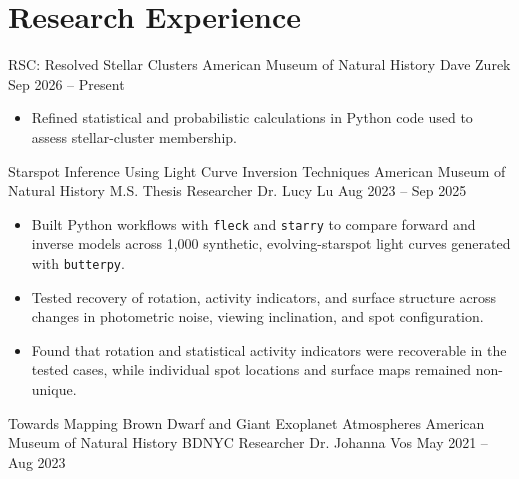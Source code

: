 
\section{Research Experience}

\researchentry
  {RSC: Resolved Stellar Clusters}
  {American Museum of Natural History}
  {}
  {Dave Zurek}
  {Sep 2026 -- Present}
  {}
\begin{itemize}[
  leftmargin=1em,
  label={--},
  itemsep=3pt,
  topsep=0pt,
  parsep=0pt,
  partopsep=0pt
]
  \item Refined statistical and probabilistic calculations in Python code used to assess stellar-cluster membership.
\end{itemize}

\researchentry
  {Starspot Inference Using Light Curve Inversion Techniques}
  {American Museum of Natural History}
  {M.S. Thesis Researcher}
  {Dr. Lucy Lu}
  {Aug 2023 -- Sep 2025}
  {}
\begin{itemize}[
  leftmargin=1em,
  label={--},
  itemsep=3pt,
  topsep=0pt,
  parsep=0pt,
  partopsep=0pt
]
  \item Built Python workflows with \texttt{fleck} and \texttt{starry} to
  compare forward and inverse models across 1,000 synthetic, evolving-starspot
  light curves generated with \texttt{butterpy}.

  \item Tested recovery of rotation, activity indicators, and surface structure
  across changes in photometric noise, viewing inclination, and spot
  configuration.

  \item Found that rotation and statistical activity indicators were
  recoverable in the tested cases, while individual spot locations and surface
  maps remained non-unique.
\end{itemize}

\vspace{0.4em}

\researchentry
  {Towards Mapping Brown Dwarf and Giant Exoplanet Atmospheres}
  {American Museum of Natural History}
  {BDNYC Researcher}
  {Dr. Johanna Vos}
  {May 2021 -- Aug 2023}
  {}

